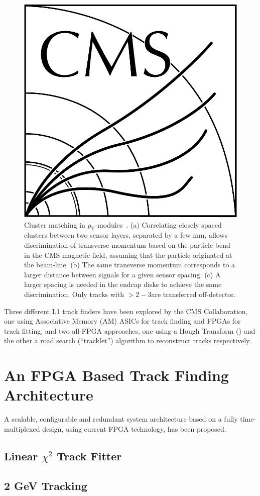 \begin{figure}[!h]
\centering
\includegraphics[width=5in]{CMS-bw-logo.pdf}
\caption{Cluster matching in $p_\mathrm{T}$-modules~\cite{P2TrackerTDR}. (a) Correlating closely spaced clusters between two sensor layers, separated by a few mm, allows discrimination of transverse momentum based on the particle bend in the CMS magnetic field, assuming that the particle originated at the beam-line. (b) The same transverse momentum corresponds to a larger distance between signals for a given sensor spacing. (c) A larger spacing is needed in the endcap disks to achieve the same discrimination. Only tracks with \pT $> 2-3$\GeVc are transferred off-detector.
}
\label{stubs}
\end{figure}
 
Three different L1 track finders have been explored by the CMS Collaboration, one using Associative Memory (AM) ASICs for track finding and FPGAs for track fitting, and two all-FPGA approaches, one using a Hough Transform (\HT) and the other a road search (``tracklet'') algorithm to reconstruct tracks respectively.

\section{An FPGA Based Track Finding Architecture}

A scalable, configurable and redundant system architecture based on a fully time-multiplexed design, using current FPGA technology, has been proposed.

\subsection{Linear $\chi^{2}$ Track Fitter}

\subsection{2 GeV Tracking}
